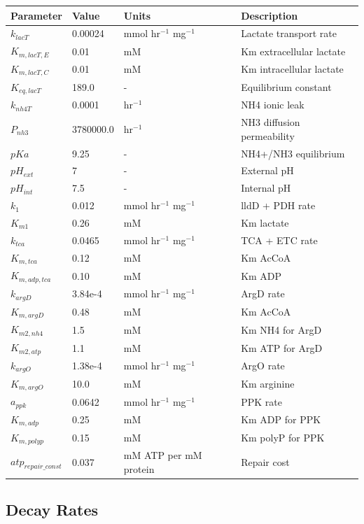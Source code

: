 \documentclass{article}
\begin{document}
\begin{tabular}{@{}llll@{}}
\toprule
Parameter & Value & Units & Description \\
\midrule
$k_{lacT}$ & 0.00024 & mmol hr$^{-1}$ mg$^{-1}$ & Lactate transport rate \\
$K_{m,lacT,E}$ & 0.01 & mM & Km extracellular lactate \\
$K_{m,lacT,C}$ & 0.01 & mM & Km intracellular lactate \\
$K_{eq,lacT}$ & 189.0 & - & Equilibrium constant \\
$k_{nh4T}$ & 0.0001 & hr$^{-1}$ & NH4 ionic leak \\
$P_{nh3}$ & 3780000.0 & hr$^{-1}$ & NH3 diffusion permeability \\
$pKa$ & 9.25 & - & NH4+/NH3 equilibrium \\
$pH_{ext}$ & 7 & - & External pH \\
$pH_{int}$ & 7.5 & - & Internal pH \\
$k_1$ & 0.012 & mmol hr$^{-1}$ mg$^{-1}$ & lldD + PDH rate \\
$K_{m1}$ & 0.26 & mM & Km lactate \\
$k_{tca}$ & 0.0465 & mmol hr$^{-1}$ mg$^{-1}$ & TCA + ETC rate \\
$K_{m,tca}$ & 0.12 & mM & Km AcCoA \\
$K_{m,adp,tca}$ & 0.10 & mM & Km ADP \\
$k_{argD}$ & 3.84e-4 & mmol hr$^{-1}$ mg$^{-1}$ & ArgD rate \\
$K_{m,argD}$ & 0.48 & mM & Km AcCoA \\
$K_{m2,nh4}$ & 1.5 & mM & Km NH4 for ArgD \\
$K_{m2,atp}$ & 1.1 & mM & Km ATP for ArgD \\
$k_{argO}$ & 1.38e-4 & mmol hr$^{-1}$ mg$^{-1}$ & ArgO rate \\
$K_{m,argO}$ & 10.0 & mM & Km arginine \\
$a_{ppk}$ & 0.0642 & mmol hr$^{-1}$ mg$^{-1}$ & PPK rate \\
$K_{m,adp}$ & 0.25 & mM & Km ADP for PPK \\
$K_{m,polyp}$ & 0.15 & mM & Km polyP for PPK \\
$atp_{repair\_const}$ & 0.037 & mM ATP per mM protein & Repair cost \\
\bottomrule
\end{tabular}

\subsection{Decay Rates}
\end{document}
